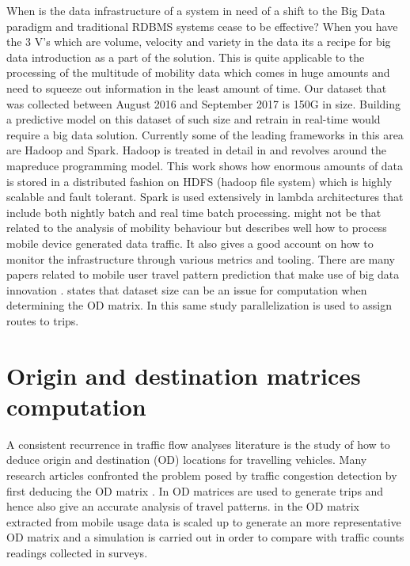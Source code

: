 \documentclass[12pt, a4paper]{report}
\theoremstyle{definition}
\theoremstyle{definition}%
\theoremstyle{definition}%
\theoremstyle{definition}%
\theoremstyle{definition}%
\theoremstyle{definition}%
\begin{document}
When is the data infrastructure of a system in need of a shift to the Big Data paradigm and traditional RDBMS systems cease to be effective? When you have the 3 V's which are volume, velocity and variety in the data its a recipe for big data introduction as a part of the solution. This is quite applicable to the processing of the multitude of mobility data which comes in huge amounts and need to squeeze out information in the least amount of time. Our dataset that was collected between August 2016 and September 2017 is 150G in size. Building a predictive model on this dataset of such size and retrain in real-time would require a big data solution. Currently some of the leading frameworks in this area are Hadoop and Spark. Hadoop is treated in detail in \cite{Liu2014} and revolves around the mapreduce programming model. This work shows how enormous amounts of data is stored in a distributed fashion on HDFS (hadoop file system) which is highly scalable and fault tolerant. Spark is used extensively in lambda architectures that include both nightly batch and real time batch processing. \cite{Liu2014} might not be that related to the analysis of mobility behaviour but describes well how to process mobile device generated data traffic. It also gives a good account on how to monitor the infrastructure through various metrics and tooling. There are many papers related to mobile user travel pattern prediction that make use of big data innovation  \cite{Liu2014,Laurila2012,Kurien2012}. \cite{Toole2015} states that dataset size can be an issue for computation when determining the OD matrix. In this same study parallelization is used to assign routes to trips.


\section{Origin and destination matrices computation} \label{OD_Matrices}
A consistent recurrence in traffic flow analyses literature is the study of how to deduce origin and destination (OD) locations for travelling vehicles\cite{Iqbal2014}. Many research articles confronted the problem posed by traffic congestion detection by first deducing the OD matrix \cite{Toole2015,Iqbal2014,Alexander2015,Calabrese2011,Calabrese2013,Colak2015}. In \cite{Alexander2015} OD matrices are used to generate trips and hence also give an accurate analysis of travel patterns. in \cite{Iqbal2014} the OD matrix extracted from mobile usage data is scaled up to generate an more representative OD matrix and a simulation is carried out in order to compare with traffic counts readings collected in surveys.
\end{document}
